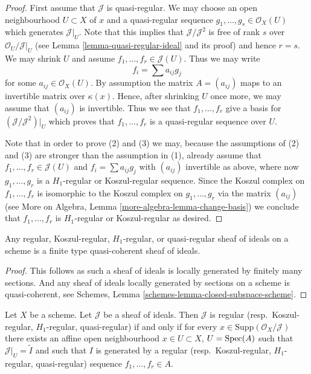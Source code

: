 \begin{proof}
First assume that $\mathcal{J}$ is quasi-regular. We may choose an
open neighbourhood $U \subset X$ of $x$ and a quasi-regular sequence
$g_1, \ldots, g_s \in \mathcal{O}_X(U)$ which generates $\mathcal{J}|_U$.
Note that this implies that $\mathcal{J}/\mathcal{J}^2$ is free of
rank $s$ over $\mathcal{O}_U/\mathcal{J}|_U$ (see
Lemma \ref{lemma-quasi-regular-ideal}
and its proof) and hence $r = s$.
We may shrink $U$ and assume $f_1, \ldots, f_r \in \mathcal{J}(U)$.
Thus we may write
$$
f_i = \sum a_{ij} g_j
$$
for some $a_{ij} \in \mathcal{O}_X(U)$. By assumption the matrix
$A = (a_{ij})$ maps to an invertible matrix over $\kappa(x)$.
Hence, after shrinking $U$ once more, we may assume that $(a_{ij})$
is invertible. Thus we see that $f_1, \ldots, f_r$ give a basis
for $(\mathcal{J}/\mathcal{J}^2)|_U$ which proves that $f_1, \ldots, f_r$
is a quasi-regular sequence over $U$.

\medskip\noindent
Note that in order to prove (2) and (3) we may, because the assumptions
of (2) and (3) are stronger than the assumption in (1), already assume that
$f_1, \ldots, f_r \in \mathcal{J}(U)$ and $f_i = \sum a_{ij}g_j$
with $(a_{ij})$ invertible as above, where now $g_1, \ldots, g_r$
is a $H_1$-regular or Koszul-regular sequence. Since the Koszul complex
on $f_1, \ldots, f_r$ is isomorphic to the Koszul complex on
$g_1, \ldots, g_r$ via the matrix $(a_{ij})$ (see
More on Algebra, Lemma \ref{more-algebra-lemma-change-basis})
we conclude that $f_1, \ldots, f_r$ is $H_1$-regular or Koszul-regular
as desired.
\end{proof}

\begin{lemma}
\label{lemma-regular-ideal-sheaf-quasi-coherent}
Any regular, Koszul-regular, $H_1$-regular, or quasi-regular sheaf
of ideals on a scheme is a finite type quasi-coherent sheaf of ideals.
\end{lemma}

\begin{proof}
This follows as such a sheaf of ideals is locally generated by
finitely many sections. And any sheaf of ideals locally generated
by sections on a scheme is quasi-coherent, see
Schemes, Lemma \ref{schemes-lemma-closed-subspace-scheme}.
\end{proof}

\begin{lemma}
\label{lemma-regular-ideal-sheaf-scheme}
Let $X$ be a scheme. Let $\mathcal{J}$ be a sheaf of ideals.
Then $\mathcal{J}$ is regular
(resp.\ Koszul-regular, $H_1$-regular, quasi-regular) if and only if
for every $x \in \text{Supp}(\mathcal{O}_X/\mathcal{J})$ there exists
an affine open neighbourhood $x \in U \subset X$, $U = \mathop{\mathrm{Spec}}(A)$
such that $\mathcal{J}|_U = \widetilde{I}$ and such that $I$
is generated by a regular (resp.\ Koszul-regular, $H_1$-regular,
quasi-regular) sequence $f_1, \ldots, f_r \in A$.
\end{lemma}

